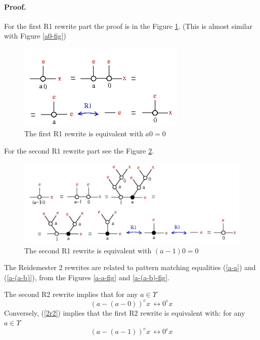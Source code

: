 \documentclass{article}
\begin{document}
\paragraph{Proof.} For the first R1 rewrite part the proof is  in the Figure \ref{a0r1-fig}. (This is almost similar with Figure \ref{a0-fig})
\begin{figure}[h]\centerline{\includegraphics[width=80mm]{jpg/a0r1.jpg}}  \caption{ The first R1 rewrite is equivalent with $a 0 = 0$ } \label{a0r1-fig} \end{figure}
For the second R1 rewrite part see  the Figure \ref{a-1r1-fig}. 
\begin{figure}[h]\centerline{\includegraphics[width=120mm]{jpg/a-1r1.jpg}}  \caption{ The second R1 rewrite is equivalent with $(a-1) 0 = 0$ } \label{a-1r1-fig} \end{figure}

\vspace{.5cm}


The Reidemester 2 rewrites are related to pattern matching equalities (\ref{a-a}) and (\ref{a-(a-b)}),  from the Figures \ref{a-a-fig} and \ref{a-(a-b)-fig}.  

\begin{proposition}
The second R2 rewrite implies that for any $a \in \Upsilon$
\begin{equation} 
 (a - (a - 0))^{e} x \, \longleftrightarrow 0^{e} x 
\label{2r2}
\end{equation}
Conversely, (\ref{2r2}) implies that the first R2 rewrite is equivalent with: for any $a \in \Upsilon$
\begin{equation} 
 (a - (a - 1))^{e} x \, \longleftrightarrow 0^{e} x 
\label{1r2}
\end{equation}
\label{pr2}
\end{proposition}
\end{document}
